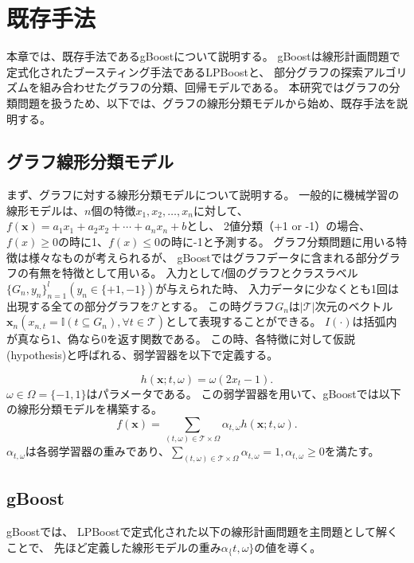 \chapter{既存手法}
本章では、既存手法であるgBoost\cite{gBoost}について説明する。
gBoostは線形計画問題で定式化されたブースティング手法であるLPBoost\cite{lpboost}と、
部分グラフの探索アルゴリズムを組み合わせたグラフの分類、回帰モデルである。
本研究ではグラフの分類問題を扱うため、以下では、グラフの線形分類モデルから始め、既存手法を説明する。

\section{グラフ線形分類モデル}
まず、グラフに対する線形分類モデルについて説明する。
一般的に機械学習の線形モデルは、$n$個の特徴$x_1,x_2, \ldots ,x_n$に対して、
$f(\bm{x}) = a_1x_1+a_2x_2+ \cdots +a_nx_n+b$とし、
2値分類（+1 or -1）の場合、$f(x) \geq 0$の時に1、$f(x) \leq 0$の時に-1と予測する。
グラフ分類問題に用いる特徴は様々なものが考えられるが、
gBoostではグラフデータに含まれる部分グラフの有無を特徴として用いる。
入力として$l$個のグラフとクラスラベル$\{G_n, y_n\}^l_{n=1} (y_n \in \{+1, -1\})$が与えられた時、
入力データに少なくとも1回は出現する全ての部分グラフを$\mathcal{T}$とする。
この時グラフ$G_n$は$|\mathcal{T}|$次元のベクトル$\bm{x}_n(x_{n,t} = \mathbb{I}(t \subseteq G_n), \forall t \in \mathcal{T})$として表現することができる。
$I(\cdot)$は括弧内が真なら1、偽なら0を返す関数である。
この時、各特徴に対して仮説(hypothesis)と呼ばれる、弱学習器を以下で定義する。

\begin{equation*}
	h(\bm{x};t,\omega) = \omega (2x_t - 1).
\end{equation*}
$\omega \in \Omega = \{-1,1\}$はパラメータである。
この弱学習器を用いて、gBoostでは以下の線形分類モデルを構築する。
\begin{equation*}
	f(\bm{x}) = \sum_{(t,\omega) \in \mathcal{T}\times \Omega} \alpha_{t,\omega} h(\bm{x};t,\omega).
\end{equation*}
$\alpha_{t,\omega}$は各弱学習器の重みであり、$\sum_{(t,\omega) \in \mathcal{T}\times \Omega} \alpha_{t,\omega}=1,\alpha_{t,\omega} \geq 0$を満たす。


\section{gBoost}
gBoostでは、
LPBoostで定式化された以下の線形計画問題を主問題として解くことで、
先ほど定義した線形モデルの重み$\alpha_\{t,\omega\}$の値を導く。


